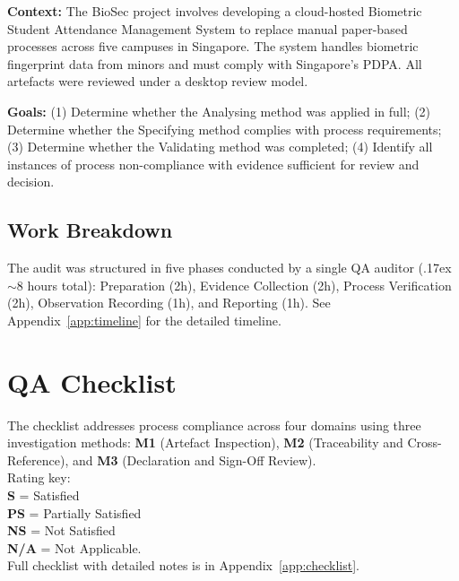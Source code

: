 \documentclass[11pt,a4paper]{article}
\begin{document}
\textbf{Context:} The BioSec project involves developing a cloud-hosted Biometric Student Attendance Management System to replace manual paper-based processes across five campuses in Singapore. The system handles biometric fingerprint data from minors and must comply with Singapore's PDPA. All artefacts were reviewed under a desktop review model.

\textbf{Goals:} (1) Determine whether the Analysing method was applied in full; (2) Determine whether the Specifying method complies with process requirements; (3) Determine whether the Validating method was completed; (4) Identify all instances of process non-compliance with evidence sufficient for review and decision.

\subsection{Work Breakdown}

The audit was structured in five phases conducted by a single QA auditor ({\raise.17ex\hbox{$\scriptstyle\sim$}}8 hours total): Preparation (2h), Evidence Collection (2h), Process Verification (2h), Observation Recording (1h), and Reporting (1h). See Appendix~\ref{app:timeline} for the detailed timeline.

\section{QA Checklist}

The checklist addresses process compliance across four domains using three investigation methods: \textbf{M1} (Artefact Inspection), \textbf{M2} (Traceability and Cross-Reference), and \textbf{M3} (Declaration and Sign-Off Review). \\Rating key:\\\textbf{S} = Satisfied\\\textbf{PS} = Partially Satisfied\\\textbf{NS} = Not Satisfied\\\textbf{N/A} = Not Applicable.\\Full checklist with detailed notes is in Appendix~\ref{app:checklist}.
\end{document}

